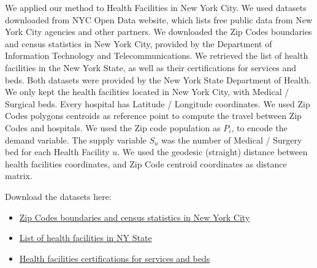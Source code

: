 We applied our method to Health Facilities in New York City. We used datasets
downloaded from NYC Open Data website, which lists free public data from New
York City agencies and other partners. We downloaded the Zip Codes boundaries
and census statistics in New York City, provided by the Department of
Information Technology and Telecommunications. We retrieved the list of health
facilities in the New York State, as well as their certifications for services
and beds. Both datasets were provided by the New York State Department of
Health. We only kept the health facilities located in New York City, with
Medical / Surgical beds. Every hospital has Latitude / Longitude coordinates. We
used Zip Codes polygons centroids as reference point to compute the travel
between Zip Codes and hospitals. We used the Zip code population as $P_i$, to
encode the demand variable. The supply variable $S_u$ was the number of Medical
/ Surgery bed for each Health Facility $u$. We used the geodesic (straight)
distance between health facilities coordinates, and Zip Code centroid
coordinates as distance matrix.

Download the datasets here:

\begin{itemize}
    \item
          \href{https://data.beta.nyc/dataset/nyc-zip-code-tabulation-areas/resource/894e9162-871c-4552-a09c-c6915d8783fb}{Zip
              Codes boundaries and census statistics in New York City}
    \item
          \href{https://health.data.ny.gov/Health/Health-Facility-General-Information/vn5v-hh5r}{List
              of health facilities in NY State}
    \item
          \href{https://health.data.ny.gov/Health/Health-Facility-Certification-Information/2g9y-7kqm}{Health
              facilities certifications for services and beds}
\end{itemize}

